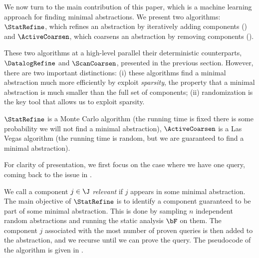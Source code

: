 
We now turn to the main contribution of this paper, which is a machine learning
approach for finding minimal abstractions.  We present two algorithms:
$\StatRefine$, which refines an abstraction by iteratively adding components
() and $\ActiveCoarsen$, which coarsens an abstraction by removing components
().

These two algorithms at a high-level parallel their deterministic counterparts,
$\DatalogRefine$ and $\ScanCoarsen$, presented in the previous section.
However, there are two important distinctions:
(i) these algorithms find a minimal abstraction much more efficiently by exploit {\em sparsity}, the
property that a minimal abstraction is much smaller than the full set of components;
(ii) randomization is the key tool that allows us to exploit sparsity.

$\StatRefine$ is a Monte Carlo algorithm (the running time is fixed
there is some probability we will not find a minimal abstraction),
$\ActiveCoarsen$ is a Las Vegas algorithm (the running time is random, but we
are guaranteed to find a minimal abstraction).

For clarity of presentation, we first focus on the case where we have one
query, coming back to the issue in .


We call a component $j \in \J$ {\em relevant} if $j$ appears in some minimal
abstraction.
The main objective of $\StatRefine$ is to identify a component
guaranteed to be part of some minimal abstraction.
This is done by sampling $n$ independent random abstractions and running the
static analysis $\bF$ on them.  The component $j$ associated with
the most number of proven queries is then added to the abstraction, and we
recurse until we can prove the query.
The pseudocode of the algorithm is given in .

